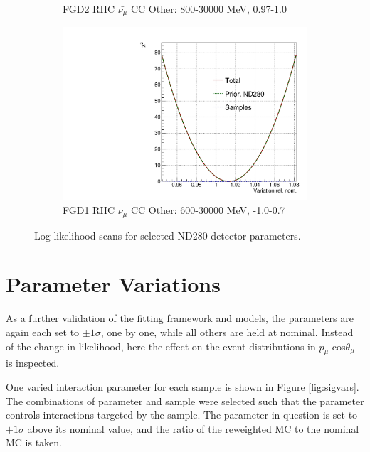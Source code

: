 \begin{figure}
\begin{subfigure}{.49\textwidth}
  \caption{FGD2 RHC $\bar{\nu_{\mu}}$ CC Other: 800-30000 MeV, 0.97-1.0}
\end{subfigure}
\begin{subfigure}{.49\textwidth}
  \centering
  \includegraphics[width=0.7\linewidth]{figs/llh/ndd_556_llh.pdf}
  \caption{FGD1 RHC $\nu_{\mu}$ CC Other: 600-30000 MeV, -1.0-0.7}
\end{subfigure}
\caption{Log-likelihood scans for selected ND280 detector parameters.}
\label{fig:llhdet}
\end{figure}

\section{Parameter Variations}\label{sec:sigvar}

As a further validation of the fitting framework and models, the parameters are again each set to $\pm1\sigma$, one by one, while all others are held at nominal. Instead of the change in likelihood, here the effect on the event distributions in $p_{\mu}$-cos$\theta_{\mu}$ is inspected. 

One varied interaction parameter for each sample is shown in Figure \ref{fig:sigvars}. The combinations of parameter and sample were selected such that the parameter controls interactions targeted by the sample. The parameter in question is set to $+1\sigma$ above its nominal value, and the ratio of the reweighted MC to the nominal MC is taken.

